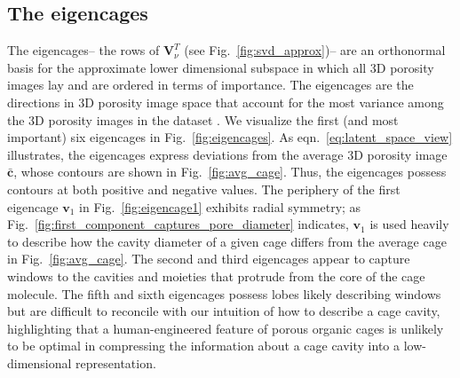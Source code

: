 \documentclass[journal=jacsat,manuscript=article,layout=traditional]{achemso}
\begin{document}
\subsection{The eigencages} The eigencages-- the rows of $\mathbf{V}_\nu^T$ (see Fig.~\ref{fig:svd_approx})-- are an orthonormal basis for the approximate lower dimensional subspace in which all 3D porosity images lay and are ordered in terms of importance. The eigencages are the directions in 3D porosity image space that account for the most variance among the 3D porosity images in the dataset \cite{strang1993introduction}. We visualize the first (and most important) six eigencages in Fig.~\ref{fig:eigencages}. As eqn.~\ref{eq:latent_space_view} illustrates, the eigencages express deviations from the average 3D porosity image $\bar{\mathbf{c}}$, whose contours are shown in Fig.~\ref{fig:avg_cage}. Thus, the eigencages possess contours at both positive and negative values. The periphery of the first eigencage $\mathbf{v}_1$ in Fig.~\ref{fig:eigencage1} exhibits radial symmetry; as Fig.~\ref{fig:first_component_captures_pore_diameter} indicates, $\mathbf{v}_1$ is used heavily to describe how the cavity diameter of a given cage differs from the average cage in Fig.~\ref{fig:avg_cage}. The second and third eigencages appear to capture windows to the cavities and moieties that protrude from the core of the cage molecule. The fifth and sixth eigencages possess lobes likely describing windows but are difficult to reconcile with our intuition of how to describe a cage cavity, highlighting that a human-engineered feature of porous organic cages is unlikely to be optimal in compressing the information about a cage cavity into a low-dimensional representation.
\end{document}
